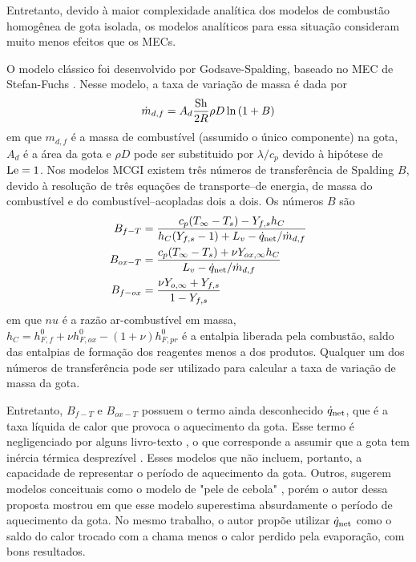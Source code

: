 Entretanto, devido à maior complexidade analítica dos modelos de combustão homogênea de gota isolada, os modelos analíticos para essa situação consideram muito menos efeitos que os MECs.

O modelo clássico foi desenvolvido por Godsave-Spalding, baseado no MEC de Stefan-Fuchs \cite{Glassman2008,Law2006,Turns2000}.
Nesse modelo, a taxa de variação de massa é dada por
\begin{equation}
    \dot m_{d,f} = A_d \frac{\mathrm{Sh}}{2R} \rho D \ln{(1 + B)} \label{eq:m_evap_B_M_2}
\end{equation}
em que $m_{d,f}$ é a massa de combustível (assumido o único componente) na gota, $A_d$ é a área da gota e $\rho D$ pode ser substituido por $\lambda/c_p$ devido à hipótese de $\mathrm{Le}=1$.
Nos modelos MCGI existem três números de transferência de Spalding $B$, devido à resolução de três equações de transporte--de energia, de massa do combustível e do combustível--acopladas dois a dois.
Os números $B$ são
\begin{align}
    B_{f-T}  &= \frac{c_p(T_\infty - T_s) - Y_{f,s} h_C}{h_C(Y_{f,s} - 1) + L_v - \dot q_{\mathrm{net}}/\dot m_{d,f}} \label{eq:B_fq}\\
    B_{ox-T} &= \frac{c_p(T_\infty - T_s) + \nu Y_{ox,\infty}h_C}{L_v  - \dot q_{\mathrm{net}}/\dot m_{d,f}} \label{eq:B_oq}\\
    B_{f-ox} &= \frac{\nu Y_{o,\infty} + Y_{f,s}}{1 - Y_{f,s}} \label{eq:B_fo}
\end{align}
em que $nu$ é a razão ar-combustível em massa, $h_C=h^0_{F,f} + \nu h^0_{F,ox} - (1+\nu)h^0_{F,pr}$ é a entalpia liberada pela combustão, saldo das entalpias de formação dos reagentes menos a dos produtos.
Qualquer um dos números de transferência pode ser utilizado para calcular a taxa de variação de massa da gota.

Entretanto, $B_{f-T}$ e $B_{ox-T}$ possuem o termo ainda desconhecido $\dot q_{\mathrm{net}}$, que é a taxa líquida de calor que provoca o aquecimento da gota.
Esse termo é negligenciado por alguns livro-texto \cite{Glassman2008,Williams1985}, o que corresponde a assumir que a gota tem inércia térmica desprezível \cite{Turns2000}. 
Esses modelos que não incluem, portanto, a capacidade de representar o  período de aquecimento da gota.
Outros, sugerem modelos conceituais como o modelo de "pele de cebola" \cite[cpt. 10]{Turns2000}, porém o autor dessa proposta mostrou em \cite{HenningsJ2024MT} que esse modelo superestima absurdamente o período de aquecimento da gota.
No mesmo trabalho, o autor propõe utilizar $\dot q_{\mathrm{net}}$ como o saldo do calor trocado com a chama menos o calor perdido pela evaporação, com bons resultados.

